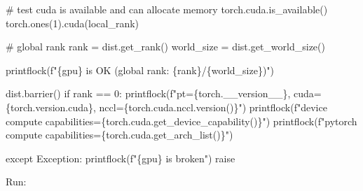 \documentclass[
]{report}
\newenvironment{Shaded}{\begin{snugshade}}{\end{snugshade}}
\newcommand{\CommentTok}[1]{\textcolor[rgb]{0.37,0.37,0.37}{#1}}
\newcommand{\ControlFlowTok}[1]{\textcolor[rgb]{0.00,0.23,0.31}{#1}}
\newcommand{\ErrorTok}[1]{\textcolor[rgb]{0.68,0.00,0.00}{#1}}
\newcommand{\ExtensionTok}[1]{\textcolor[rgb]{0.00,0.23,0.31}{#1}}
\newcommand{\FunctionTok}[1]{\textcolor[rgb]{0.28,0.35,0.67}{#1}}
\newcommand{\KeywordTok}[1]{\textcolor[rgb]{0.00,0.23,0.31}{#1}}
\newcommand{\NormalTok}[1]{\textcolor[rgb]{0.00,0.23,0.31}{#1}}
\newcommand{\StringTok}[1]{\textcolor[rgb]{0.13,0.47,0.30}{#1}}
\begin{document}
\begin{Shaded}
\begin{Highlighting}[]
    \CommentTok{\# test cuda is available and can allocate memory}
    \FunctionTok{torch.cuda.is\_available()}
    \ExtensionTok{torch.ones}\ErrorTok{(}\ExtensionTok{1}\KeywordTok{)}\ExtensionTok{.cuda}\ErrorTok{(}\ExtensionTok{local\_rank}\KeywordTok{)}

    \CommentTok{\# global rank}
    \ExtensionTok{rank}\NormalTok{ = dist.get\_rank}\ErrorTok{(}\KeywordTok{)}
    \ExtensionTok{world\_size}\NormalTok{ = dist.get\_world\_size}\ErrorTok{(}\KeywordTok{)}

    \ExtensionTok{printflock}\ErrorTok{(}\ExtensionTok{f}\StringTok{"\{gpu\} is OK (global rank: \{rank\}/\{world\_size\})"}\KeywordTok{)}

    \FunctionTok{dist.barrier()}
    \ControlFlowTok{if} \ExtensionTok{rank}\NormalTok{ == 0:}
        \ExtensionTok{printflock}\ErrorTok{(}\ExtensionTok{f}\StringTok{"pt=\{torch.\_\_version\_\_\}, cuda=\{torch.version.cuda\}, nccl=\{torch.cuda.nccl.version()\}"}\KeywordTok{)}
        \ExtensionTok{printflock}\ErrorTok{(}\ExtensionTok{f}\StringTok{"device compute capabilities=\{torch.cuda.get\_device\_capability()\}"}\KeywordTok{)}
        \ExtensionTok{printflock}\ErrorTok{(}\ExtensionTok{f}\StringTok{"pytorch compute capabilities=\{torch.cuda.get\_arch\_list()\}"}\KeywordTok{)}

\ExtensionTok{except}\NormalTok{ Exception:}
    \ExtensionTok{printflock}\ErrorTok{(}\ExtensionTok{f}\StringTok{"\{gpu\} is broken"}\KeywordTok{)}
    \ExtensionTok{raise}
\end{Highlighting}
\end{Shaded}

Run:
\end{document}
